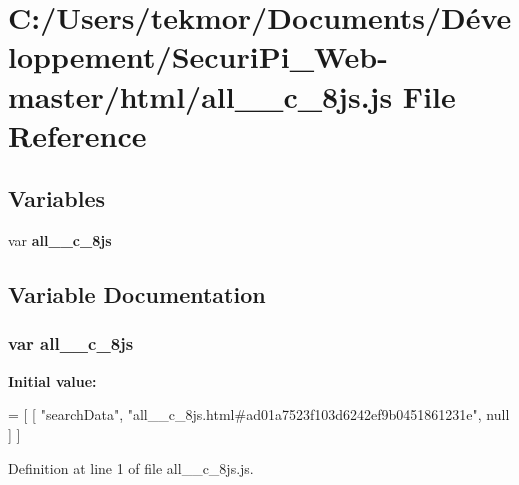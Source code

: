 \section{C\+:/\+Users/tekmor/\+Documents/\+Développement/\+Securi\+Pi\+\_\+\+Web-\/master/html/all\+\_\+\+\_\+c\+\_\+8js.js File Reference}
\label{all____c__8js_8js}
\subsection*{Variables}
\begin{DoxyCompactItemize}
\item 
var {\bf all\+\_\+\+\_\+c\+\_\+8js}
\end{DoxyCompactItemize}


\subsection{Variable Documentation}
\subsubsection[{all\+\_\+\+\_\+c\+\_\+8js}]{\setlength{\rightskip}{0pt plus 5cm}var all\+\_\+\+\_\+c\+\_\+8js}\label{all____c__8js_8js_a90d74e7cd9fdac1813d778159d777a7b}
{\bfseries Initial value\+:}
\begin{DoxyCode}
=
[
    [ \textcolor{stringliteral}{"searchData"}, \textcolor{stringliteral}{"all\_\_c\_8js.html#ad01a7523f103d6242ef9b0451861231e"}, null ]
]
\end{DoxyCode}


Definition at line 1 of file all\+\_\+\+\_\+c\+\_\+8js.\+js.

